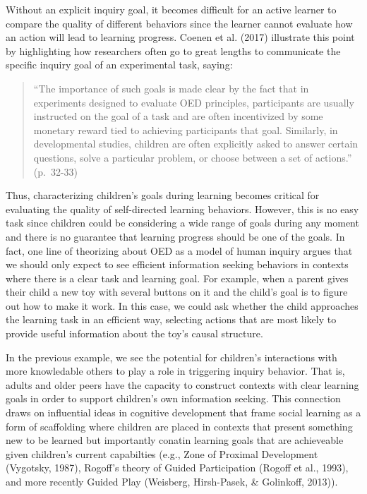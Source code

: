 \documentclass[english,floatsintext,man]{apa6}
\theoremstyle{definition}
\theoremstyle{definition}
\theoremstyle{definition}
\theoremstyle{remark}
\begin{document}
\noindent
Without an explicit inquiry goal, it becomes difficult for an active
learner to compare the quality of different behaviors since the learner
cannot evaluate how an action will lead to learning progress. Coenen et
al. (2017) illustrate this point by highlighting how researchers often
go to great lengths to communicate the specific inquiry goal of an
experimental task, saying:

\begin{quote}
\enquote{The importance of such goals is made clear by the fact that in
experiments designed to evaluate OED principles, participants are
usually instructed on the goal of a task and are often incentivized by
some monetary reward tied to achieving participants that goal.
Similarly, in developmental studies, children are often explicitly asked
to answer certain questions, solve a particular problem, or choose
between a set of actions.} (p.~32-33)
\end{quote}

\noindent
Thus, characterizing children's goals during learning becomes critical
for evaluating the quality of self-directed learning behaviors. However,
this is no easy task since children could be considering a wide range of
goals during any moment and there is no guarantee that learning progress
should be one of the goals. In fact, one line of theorizing about OED as
a model of human inquiry argues that we should only expect to see
efficient information seeking behaviors in contexts where there is a
clear task and learning goal. For example, when a parent gives their
child a new toy with several buttons on it and the child's goal is to
figure out how to make it work. In this case, we could ask whether the
child approaches the learning task in an efficient way, selecting
actions that are most likely to provide useful information about the
toy's causal structure.

In the previous example, we see the potential for children's
interactions with more knowledable others to play a role in triggering
inquiry behavior. That is, adults and older peers have the capacity to
construct contexts with clear learning goals in order to support
children's own information seeking. This connection draws on influential
ideas in cognitive development that frame social learning as a form of
scaffolding where children are placed in contexts that present something
new to be learned but importantly conatin learning goals that are
achieveable given children's current capabilties (e.g., Zone of Proximal
Development (Vygotsky, 1987), Rogoff's theory of Guided Participation
(Rogoff et al., 1993), and more recently Guided Play (Weisberg,
Hirsh-Pasek, \& Golinkoff, 2013)).
\end{document}
